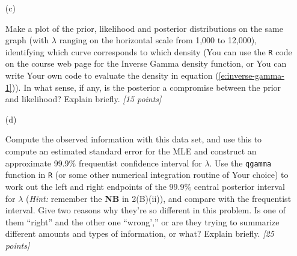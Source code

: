 \documentclass[12pt]{article}
\begin{document}
\begin{itemize}
\begin{itemize}
\begin{itemize}
\bigskip

\item[(c)] 

Make a plot of the prior, likelihood and posterior distributions on the same graph (with $\lambda$ ranging on the horizontal scale from 1,000 to 12,000), identifying which curve corresponds to which density (You can use the \texttt{R} code on the course web page for the Inverse Gamma density function, or You can write Your own code to evaluate the density in equation (\ref{e:inverse-gamma-1})). In what sense, if any, is the posterior a compromise between the prior and likelihood? Explain briefly. \textit{[15 points]}

\item[(d)] 

Compute the observed information with this data set, and use this to compute an estimated standard error for the MLE and construct an approximate 99.9\% frequentist confidence interval for $\lambda$. Use the \texttt{qgamma} function in \texttt{R} (or some other numerical integration routine of Your choice) to work out the left and right endpoints of the 99.9\% central posterior interval for $\lambda$ (\textit{Hint:} remember the \textbf{NB} in 2(B)(ii)), and compare with the frequentist interval. Give two reasons why they're so different in this problem. Is one of them ``right'' and the other one ``wrong','' or are they trying to summarize different amounts and types of information, or what? Explain briefly. \textit{[25 points]}

\end{itemize}

\end{itemize}

\end{itemize}
\end{document}
